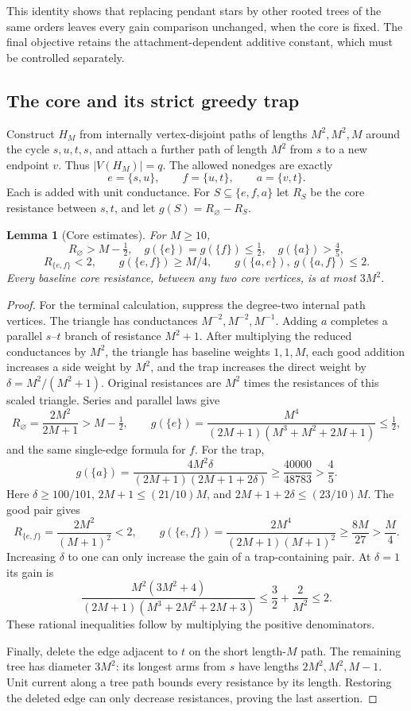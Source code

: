 \documentclass[11pt,a4paper]{article}
\newtheorem{lemma}[theorem]{Lemma}
\theoremstyle{definition}\newtheorem{definition}[theorem]{Definition}
\theoremstyle{remark}\newtheorem{remark}[theorem]{Remark}
\numberwithin{equation}{section}
\begin{document}
This identity shows that replacing pendant stars by other rooted trees of the
same orders leaves every gain comparison unchanged, when the core is fixed.
The final objective retains the attachment-dependent additive constant, which
must be controlled separately.

\subsection{The core and its strict greedy trap}

Construct $H_M$ from internally vertex-disjoint paths of lengths $M^2,M^2,M$
around the cycle $s,u,t,s$, and attach a further path of length $M^2$ from $s$
to a new endpoint $v$.  Thus $|V(H_M)|=q$.  The allowed nonedges are exactly
\[
 e=\{s,u\},\qquad f=\{u,t\},\qquad a=\{v,t\}.
\]
Each is added with unit conductance.  For $S\subseteq\{e,f,a\}$ let $R_S$ be
the core resistance between $s,t$, and let $g(S)=R_\varnothing-R_S$.

\begin{lemma}[Core estimates]
\label{ext-taisho-core}
For $M\ge10$,
\[
 R_\varnothing> M-\tfrac12,\quad
 g(\{e\})=g(\{f\})\le\tfrac12,\quad
 g(\{a\})>\tfrac45,
\]
\[
 R_{\{e,f\}}<2,\qquad
 g(\{e,f\})\ge M/4,\qquad
 g(\{a,e\}),\ g(\{a,f\})\le2.
\]
Every baseline core resistance, between any two core vertices, is at most
$3M^2$.
\end{lemma}
\begin{proof}
For the terminal calculation, suppress the degree-two internal path vertices.
The triangle has conductances $M^{-2},M^{-2},M^{-1}$.  Adding $a$ completes a
parallel $s$--$t$ branch of resistance $M^2+1$.  After multiplying the reduced
conductances by $M^2$, the triangle has baseline weights $1,1,M$, each good
addition increases a side weight by $M^2$, and the trap increases the direct
weight by $\delta=M^2/(M^2+1)$.  Original resistances are $M^2$ times the
resistances of this scaled triangle.  Series and parallel laws give
\[
 R_\varnothing=\frac{2M^2}{2M+1}>M-\tfrac12,
 \qquad
 g(\{e\})=\frac{M^4}{(2M+1)(M^3+M^2+2M+1)}\le\tfrac12,
\]
and the same single-edge formula for $f$.  For the trap,
\[
 g(\{a\})=\frac{4M^2\delta}{(2M+1)(2M+1+2\delta)}
 \ge\frac{40000}{48783}>\frac45.
\]
Here $\delta\ge100/101$, $2M+1\le(21/10)M$, and
$2M+1+2\delta\le(23/10)M$.  The good pair gives
\[
 R_{\{e,f\}}=\frac{2M^2}{(M+1)^2}<2,
 \qquad
 g(\{e,f\})=\frac{2M^4}{(2M+1)(M+1)^2}
 \ge\frac{8M}{27}>\frac M4.
\]
Increasing $\delta$ to one can only increase the gain of a trap-containing pair.
At $\delta=1$ its gain is
\[
 \frac{M^2(3M^2+4)}{(2M+1)(M^3+2M^2+2M+3)}
 \le\frac32+\frac2{M^2}\le2.
\]
These rational inequalities follow by multiplying the positive denominators.

Finally, delete the edge adjacent to $t$ on the short length-$M$ path.
The remaining tree has diameter $3M^2$: its longest arms from $s$ have lengths
$2M^2,M^2,M-1$.  Unit current along a tree path bounds every resistance by its
length.  Restoring the deleted edge can only decrease resistances, proving the
last assertion.
\end{proof}
\end{document}
